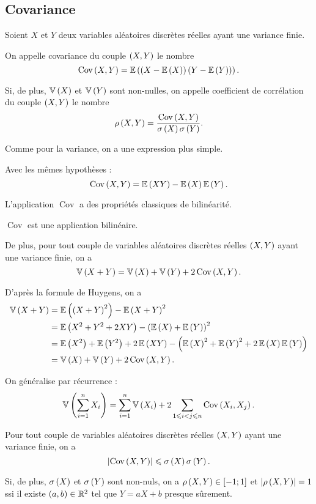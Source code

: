 \subsection{Covariance}

\begin{defi}
Soient \(X\) et \(Y\) deux variables aléatoires discrètes réelles ayant une variance finie.

On appelle covariance du couple \(\paren{X,Y}\) le nombre \[\cov{X}{Y}=\esp{\paren{X-\esp{X}}\paren{Y-\esp{Y}}}.\]

Si, de plus, \(\vari{X}\) et \(\vari{Y}\) sont non-nulles, on appelle coefficient de corrélation du couple \(\paren{X,Y}\) le nombre \[\coeffcorr{X}{Y}=\dfrac{\cov{X}{Y}}{\ecarttype{X}\ecarttype{Y}}.\]
\end{defi}

Comme pour la variance, on a une expression plus simple.

\begin{prop}
Avec les mêmes hypothèses : \[\cov{X}{Y}=\esp{XY}-\esp{X}\esp{Y}.\]
\end{prop}

L'application \(\operatorname{Cov}\) a des propriétés classiques de bilinéarité.

\begin{prop}
\(\operatorname{Cov}\) est une application bilinéaire.

De plus, pour tout couple de variables aléatoires discrètes réelles \(\paren{X,Y}\) ayant une variance finie, on a \[\vari{X+Y}=\vari{X}+\vari{Y}+2\cov{X}{Y}.\]
\end{prop}

\begin{dem}
D'après la formule de Huygens, on a \[\begin{aligned}
\vari{X+Y}&=\esp{\paren{X+Y}^2}-\esp{X+Y}^2 \\
&=\esp{X^2+Y^2+2XY}-\paren{\esp{X}+\esp{Y}}^2 \\
&=\esp{X^2}+\esp{Y^2}+2\esp{XY}-\paren{\esp{X}^2+\esp{Y}^2+2\esp{X}\esp{Y}} \\
&=\vari{X}+\vari{Y}+2\cov{X}{Y}.
\end{aligned}\]

On généralise par récurrence : \[\vari{\sum_{i=1}^n X_i}=\sum_{i=1}^n\vari{X_i}+2\sum_{1\leq i<j\leq n}\cov{X_i}{X_j}.\]
\end{dem}

\begin{prop}
Pour tout couple de variables aléatoires discrètes réelles \(\paren{X,Y}\) ayant une variance finie, on a \[\abs{\cov{X}{Y}}\leq\ecarttype{X}\ecarttype{Y}.\]

Si, de plus, \(\ecarttype{X}\) et \(\ecarttype{Y}\) sont non-nuls, on a \(\coeffcorr{X}{Y}\in\intervii{-1}{1}\) et \(\abs{\coeffcorr{X}{Y}}=1\) ssi il existe \(\paren{a,b}\in\R^2\) tel que \(Y=aX+b\) presque sûrement.
\end{prop}

